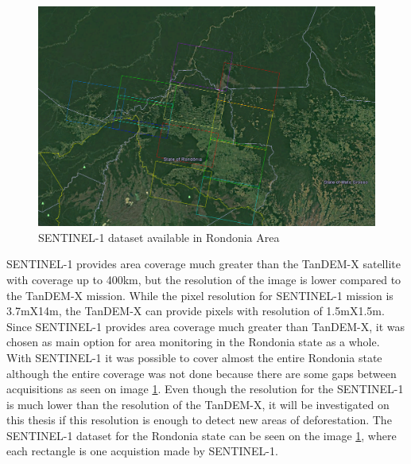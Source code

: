 \begin{figure}[H]
    \centering
    \includegraphics[width=\linewidth]{Chapter2-real/sentinel_dataset.png}
    \caption{SENTINEL-1 dataset available in Rondonia Area}
    \label{fig:sentinel_dataset}
\end{figure}{}

SENTINEL-1 provides area coverage much greater than the TanDEM-X satellite with coverage up to 400km, but the resolution of the image is lower compared to the TanDEM-X mission. While the pixel resolution for SENTINEL-1 mission is 3.7mX14m, the TanDEM-X can provide pixels with resolution of 1.5mX1.5m. Since SENTINEL-1 provides area coverage much greater than TanDEM-X, it was chosen as main option for area monitoring in the Rondonia state as a whole. With SENTINEL-1 it was possible to cover almost the entire Rondonia state although the entire coverage was not done because there are some gaps between acquisitions as seen on image \ref{fig:sentinel_dataset}. Even though the resolution for the SENTINEL-1 is much lower than the resolution of the TanDEM-X, it will be investigated on this thesis if this resolution is enough to detect new areas of deforestation. The SENTINEL-1 dataset for the Rondonia state can be seen on the image \ref{fig:sentinel_dataset}, where each rectangle is one acquistion made by SENTINEL-1.